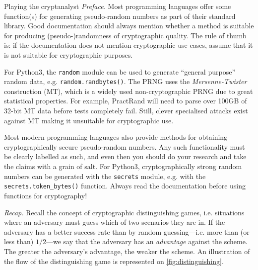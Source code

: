 \documentclass{practice}
\begin{document}
\begin{task}{Playing the cryptanalyst}
  \textit{Preface.}
  Most programming languages offer some function(s) for generating pseudo-random numbers as part of their standard library.
  Good documentation should always mention whether a method is suitable for producing (pseudo-)randomness of cryptographic quality.
  The rule of thumb is: if the documentation does not mention cryptographic use cases, assume that it is not suitable for cryptographic purposes.

  For Python3, the \texttt{random}\footnotemark{} module can be used to generate \enquote{general purpose} random data, e.g. \texttt{random.randbytes()}.
  The PRNG uses the \emph{Mersenne-Twister} construction\footnotemark{} (MT), which is a widely used non-cryptographic PRNG due to great statistical properties.
  For example, PractRand will need to parse over 100GB of 32-bit MT data before tests completely fail.
  Still, clever specialised attacks exist against MT making it unsuitable for cryptographic use.%
  
  Most modern programming languages also provide methods for obtaining cryptographically secure pseudo-random numbers.
  Any such functionality must be clearly labelled as such, and even then you should do your research and take the claims with a grain of salt.
  For Python3, cryptographically strong random numbers can be generated with the \texttt{secrets}\footnotemark{} module, e.g. with the \texttt{secrets.token\_bytes()} function.%
  Always read the documentation before using functions for cryptography!

  \textit{Recap.}
  Recall the concept of cryptographic distinguishing games, i.e. situations where an adversary must guess which of two scenarios they are in.
  If the adversary has a better success rate than by random guessing---i.e. more than (or less than) $1/2$---we say that the adversary has an \emph{advantage} against the scheme.
  The greater the adversary's advantage, the weaker the scheme.
  An illustration of the flow of the distinguishing game is represented on \autoref{fig:distinguishing}.

  \begin{figure}[h!]
    \centering
\end{figure}
\end{task}
\end{document}
